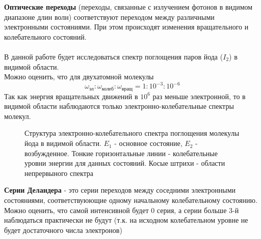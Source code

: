 \documentclass[a4paper,12pt]{article} %
\begin{document}
 \textbf{Оптические переходы} (переходы, связанные с излучением фотонов в видимом диапазоне длин волн) соответствуют переходом между различными электронными состояниями. При этом происходят изменения вращательного и колебательного состояний. \\\\
 В данной работе будет исследоваться спектр поглощения паров йода ($I_2$) в видимой области. \\ 
 Можно оценить, что для двухатомной молекулы 
 \begin{equation*}
     \omega_{\text{эл}} : \omega_{\text{колеб}} : \omega_{\text{вращ}} = 1 : 10^{-3} : 10^{-6}
 \end{equation*}
 Так как энергия вращательных движений в $10^{6}$ раз меньше электронной, то в видимой области наблюдаются только электронно-колебательные спектры молекул.

 \begin{figure}[h!]
\caption{Структура электронно-колебательного спектра поглощения молекулы йода в видимой области. $E_1$ - основное состояние, $E_2$ - возбужденное. Тонкие горизонтальные линии - колебательные уровни энергии для данных состояний. Косые штрихи - области непрервыного спектра}
\label{fig:image}
\end{figure}


\textbf{Серии Деландера} - это серии переходов между соседними электронными состояниями, соответствуюющие одному начальному колебательному состоянию. \\
Можно оценить, что самой интенсивной будет 0 серия, а серии больше 3-й наблюдаться практически не будут (т.к. на исходном колебательном уровне не будет достаточного числа электронов)\\
\end{document}
